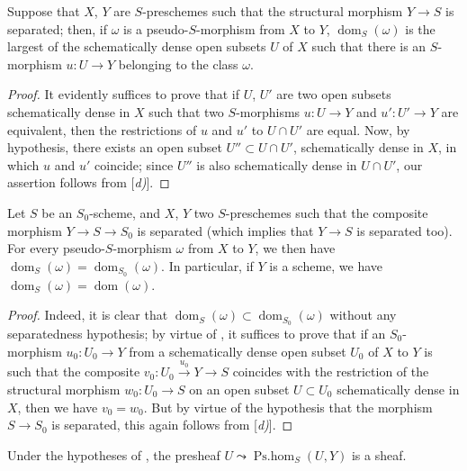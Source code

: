 \begin{proposition}[20.2.4]
\label{IV.20.2.4}
Suppose that $X$, $Y$ are $S$-preschemes such that the structural morphism $Y\to S$ is separated; then, if $\omega$ is a pseudo-$S$-morphism from $X$ to $Y$, $\operatorname{dom}_S(\omega)$ is the largest of the schematically dense open subsets $U$ of $X$ such that there is an $S$-morphism $u:U\to Y$ belonging to the class $\omega$.
\end{proposition}

\begin{proof}
It evidently suffices to prove that if $U$, $U'$ are two open subsets schematically dense in $X$ such that two $S$-morphisms $u:U\to Y$ and $u':U'\to Y$ are equivalent, then the restrictions of $u$ and $u'$ to $U\cap U'$ are equal.
Now, by hypothesis, there exists an open subset $U''\subset U\cap U'$, schematically dense in $X$, in which $u$ and $u'$ coincide; since $U''$ is also schematically dense in $U\cap U'$, our assertion follows from [\emph{d)}].
\end{proof}

\begin{corollary}[20.2.5]
\label{IV.20.2.5}
Let $S$ be an $S_0$-scheme, and $X$, $Y$ two $S$-preschemes such that the composite morphism $Y\to S\to S_0$ is separated (which implies  that $Y\to S$ is separated too).
For every pseudo-$S$-morphism $\omega$ from $X$ to $Y$, we then have $\operatorname{dom}_S(\omega)=\operatorname{dom}_{S_0}(\omega)$.
In particular, if $Y$ is a scheme, we have $\operatorname{dom}_S(\omega)=\operatorname{dom}(\omega)$.
\end{corollary}

\begin{proof}
Indeed, it is clear that $\operatorname{dom}_S(\omega)\subset\operatorname{dom}_{S_0}(\omega)$ without any separatedness hypothesis; by virtue of , it suffices to prove that if an $S_0$-morphism $u_0:U_0\to Y$ from a schematically dense open subset
$U_0$ of $X$ to $Y$ is such that the composite $v_0:U_0\xrightarrow{u_0}Y\to S$ coincides with the restriction of the structural morphism $w_0:U_0\to S$ on an open subset $U\subset U_0$ schematically dense in $X$, then we have $v_0=w_0$.
But by virtue of the hypothesis that the morphism $S\to S_0$ is separated, this again follows from [\emph{d)}].
\end{proof}

\begin{corollary}[20.2.6]
\label{IV.20.2.6}
Under the hypotheses of , the presheaf $U\leadsto\operatorname{Ps.hom}_S(U,Y)$ is a sheaf.
\end{corollary}

